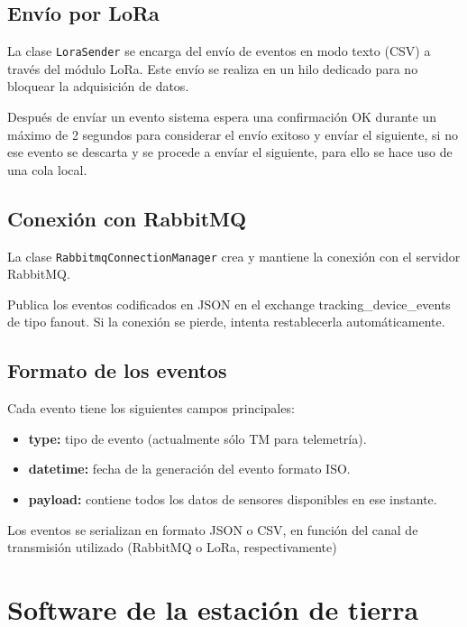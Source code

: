 \subsection{Envío por LoRa}

La clase \texttt{LoraSender} se encarga del envío de eventos en modo texto (CSV) a través del módulo LoRa.
Este envío se realiza en un hilo dedicado para no bloquear la adquisición de datos.

Después de envíar un evento sistema espera una confirmación OK durante un máximo de 2 segundos para considerar el envío exitoso y envíar el siguiente,
si no ese evento se descarta y se procede a envíar el siguiente, para ello se hace uso de una cola local.

\subsection{Conexión con RabbitMQ}

La clase \texttt{RabbitmqConnectionManager} crea y mantiene la conexión con el servidor RabbitMQ.

Publica los eventos codificados en JSON en el exchange tracking\_device\_events de tipo fanout.
Si la conexión se pierde, intenta restablecerla automáticamente.

\subsection{Formato de los eventos}

Cada evento tiene los siguientes campos principales:

\begin{itemize}
    \item \textbf{type:} tipo de evento (actualmente sólo TM para telemetría).
    \item \textbf{datetime:} fecha de la generación del evento formato ISO.
    \item \textbf{payload:} contiene todos los datos de sensores disponibles en ese instante.
\end{itemize}

Los eventos se serializan en formato JSON o CSV, en función del canal de transmisión utilizado (RabbitMQ o LoRa, respectivamente)


\section{Software de la estación de tierra}


